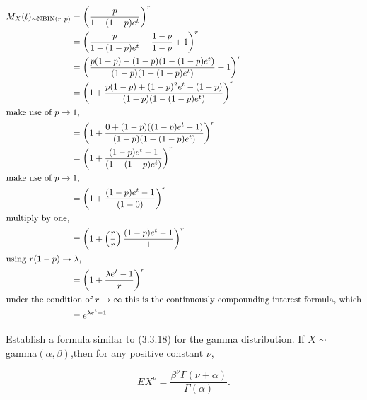 \documentclass[12pt,letterpaper]{exam}
\begin{document}
\begin{questions}
	\begin{solution}
		
		\begin{align*}
			M_X(t)_{\sim\text{NBIN(\(r,p\))}}
			&= \left( \frac{p}{1-(1-p)e^t} \right)^r \\
			&= \left( \frac{p}{1-(1-p)e^t} - \frac{1-p}{1-p} + 1 \right)^r \\
			&= \left( \frac{p(1-p) - (1-p)(1-(1-p)e^t)}{(1-p)(1-(1-p)e^t)} + 1 \right)^r \\
			&= \left( 1 + \frac{p(1-p) + (1-p)^2e^t - (1-p)}{(1-p)(1-(1-p)e^t)} \right)^r \\
		\intertext{make use of \(p \rightarrow 1\),}
			&= \left( 1 + \frac{0 + (1-p)((1-p)e^t - 1)}{(1-p)(1-(1-p)e^t)} \right)^r \\
			&= \left( 1 + \frac{(1-p)e^t - 1}{(1-(1-p)e^t)} \right)^r \\
		\intertext{make use of \(p \rightarrow 1\),}
			&= \left( 1 + \frac{(1-p)e^t - 1}{(1-0)} \right)^r \\
		\intertext{multiply by one,}
			&= \left( 1 + \left(\frac{r}{r}\right) \frac{(1-p)e^t - 1}{1} \right)^r \\
		\intertext{using \(r(1-p) \rightarrow \lambda\),}
			&= \left( 1 +  \frac{\lambda e^t - 1}{r} \right)^r \\
		\intertext{under the condition of \(r \rightarrow \infty\) this is the continuously compounding interest formula, which}
			&= e^{\lambda e^t - 1} \\
		\end{align*}
		
	\end{solution}
	\clearpage
	
	\setcounter{question}{16}
	\question 
	Establish a formula similar to (3.3.18) for the gamma distribution. 
	If \(X \sim\) gamma\((\alpha,\beta)\),then for any positive constant \(\nu\),
	
	\[EX^\nu = \frac{\beta^\nu \Gamma (\nu+\alpha)}{\Gamma(\alpha)}.\]
	

\end{questions}
\end{document}
